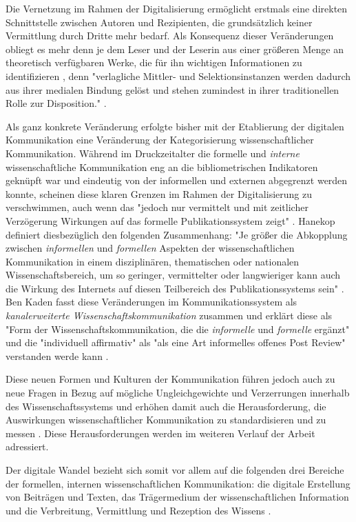 Die Vernetzung im Rahmen der Digitalisierung ermöglicht erstmals eine direkten Schnittstelle zwischen Autoren und Rezipienten, die grundsätzlich keiner Vermittlung durch Dritte mehr bedarf. Als Konsequenz dieser Veränderungen obliegt es mehr denn je dem Leser und der Leserin aus einer größeren Menge an theoretisch verfügbaren Werke, die für ihn wichtigen Informationen zu identifizieren \cite{hagner_2015_sache_buches}, denn "verlagliche Mittler- und Selektionsinstanzen werden dadurch aus ihrer medialen Bindung gelöst und stehen zumindest in ihrer traditionellen Rolle zur Disposition." \cite[:109]{naeder_2010_open}.

Als ganz konkrete Veränderung erfolgte bisher mit der Etablierung der digitalen Kommunikation eine Veränderung der Kategorisierung wissenschaftlicher Kommunikation. Während im Druckzeitalter die formelle und \textit{interne} wissenschaftliche Kommunikation eng an die bibliometrischen Indikatoren geknüpft war und eindeutig von der informellen und externen abgegrenzt werden konnte, scheinen diese klaren Grenzen im Rahmen der Digitalisierung zu verschwimmen, auch wenn das "jedoch nur vermittelt und mit zeitlicher Verzögerung Wirkungen auf das formelle Publikationssystem zeigt" \cite{Hanekop_2014}. Hanekop definiert diesbezüglich den folgenden Zusammenhang: "Je größer die Abkopplung zwischen \textit{informellen} und \textit{formellen} Aspekten der wissenschaftlichen Kommunikation in einem disziplinären, thematischen oder nationalen Wissenschaftsbereich, um so geringer, vermittelter oder langwieriger kann auch die Wirkung des Internets auf diesen Teilbereich des Publikationssystems sein" \cite{Hanekop_2014}. Ben Kaden fasst diese Veränderungen im Kommunikationssystem als \textit{kanalerweiterte Wissenschaftskommunikation} zusammen und erklärt diese als "Form der Wissenschaftskommunikation, die die \textit{informelle} und \textit{formelle} ergänzt" und die "individuell affirmativ" als "als eine Art informelles offenes Post Review" verstanden werde kann \cite{kaden_2009_library}.

Diese neuen Formen und Kulturen der Kommunikation führen jedoch auch zu neue Fragen in Bezug auf mögliche Ungleichgewichte und Verzerrungen innerhalb des Wissenschaftssystems und erhöhen damit auch die Herausforderung, die Auswirkungen wissenschaftlicher Kommunikation zu standardisieren und zu messen \cite{gerber_2014_science}. Diese Herausforderungen werden im weiteren Verlauf der Arbeit adressiert.

Der digitale Wandel bezieht sich somit vor allem auf die folgenden drei Bereiche der formellen, internen wissenschaftlichen Kommunikation: die digitale Erstellung von Beiträgen und Texten, das Trägermedium der wissenschaftlichen Information und die Verbreitung, Vermittlung und Rezeption des Wissens \cite{bbaw_publizieren_2015}.

